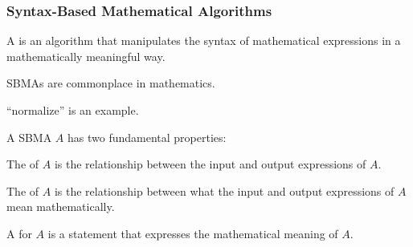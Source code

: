 \documentclass[t,12pt,numbers,fleqn]{beamer}
\begin{document}
\begin{frame}
\frametitle{Syntax-Based Mathematical Algorithms}
\bi

  \item A  is an
    algorithm that manipulates the syntax of mathematical
    expressions in a mathematically meaningful way.

\pause

  \bi

    \item SBMAs are commonplace in mathematics.

    \item ``normalize'' is an example.

  \ei

\pause

  \item A SBMA $A$ has two fundamental properties:

  \be

    \item The  of $A$ is the relationship
    between the input and output expressions of $A$.

    \item The  of $A$ is the relationship
      between what the input and output expressions of $A$ mean
      mathematically.

  \ee

\pause

  \item A  for $A$ is a statement that
    expresses the mathematical meaning of $A$.

\ei
\end{frame}

\end{document}
